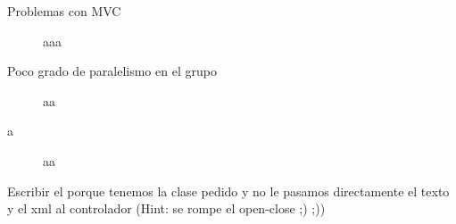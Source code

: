 
\begin{description}

\item[Problemas con MVC] aaa

\item[Poco grado de paralelismo en el grupo] aa

\item[a] aa

\end{description}

Escribir el porque tenemos la clase pedido y no le pasamos directamente el texto y el xml al controlador (Hint: se rompe el open-close ;) ;))
